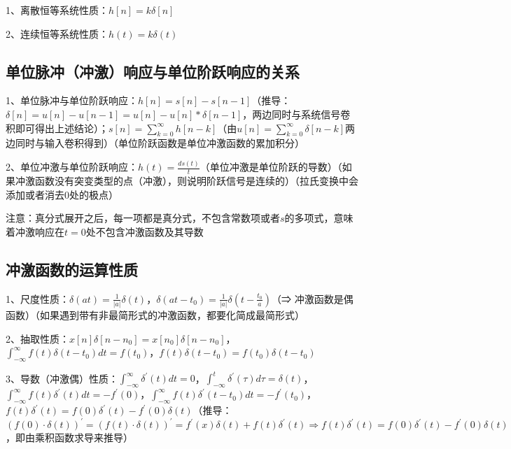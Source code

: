 1、离散恒等系统性质：$h[n]=k\delta[n]$

2、连续恒等系统性质：$h(t)=k\delta(t)$



\subsection{单位脉冲（冲激）响应与单位阶跃响应的关系}

1、单位脉冲与单位阶跃响应：$h[n]=s[n]-s[n-1]$（推导：$\delta[n]=u[n]-u[n-1]=u[n]-u[n]*\delta[n-1]$，两边同时与系统信号卷积即可得出上述结论）；$s[n]=\sum_{k=0}^{\infty}h[n-k]$（由$u[n]=\sum_{k=0}^{\infty}\delta[n-k]$两边同时与输入卷积得到）（单位阶跃函数是单位冲激函数的累加积分）

2、单位冲激与单位阶跃响应：$h(t) = \frac {ds(t)}{t}$（单位冲激是单位阶跃的导数）（如果冲激函数没有突变类型的点（冲激），则说明阶跃信号是连续的）（拉氏变换中会添加或者消去0处的极点）

注意：真分式展开之后，每一项都是真分式，不包含常数项或者$s$的多项式，意味着冲激响应在$t=0$处不包含冲激函数及其导数



\subsection{冲激函数的运算性质}

1、尺度性质：$\delta(at)=\frac{1}{|a|}\delta(t)$，$\delta(at-t_0)=\frac{1}{|a|}\delta(t-\frac{t_0}{a})$（⇒ 冲激函数是偶函数）（如果遇到带有非最简形式的冲激函数，都要化简成最简形式）

2、抽取性质：$x[n] \delta\left[n-n_{0}\right]=x\left[n_{0}\right] \delta\left[n-n_{0}\right]$，$\int_{-\infty}^{\infty} f(t) \delta\left(t-t_{0}\right) d t=f\left(t_{0}\right)$，$f(t) \delta\left(t-t_{0}\right)=f\left(t_{0}\right) \delta\left(t-t_{0}\right)$

3、导数（冲激偶）性质：$\int_{-\infty}^{\infty} \delta^{\prime}(t) d t=0$，$\int_{-\infty}^{t} \delta^{\prime}(\tau) d \tau=\delta(t)$，$\int_{-\infty}^{\infty} f(t) \delta^{\prime}(t) d t=-f^{\prime}(0)$，$\int_{-\infty}^{\infty} f(t) \delta^{\prime}\left(t-t_{0}\right) d t=-f^{\prime}\left(t_{0}\right)$，$f(t) \delta^{\prime}(t)=f(0) \delta^{\prime}(t)-f^{\prime}(0) \delta(t)$（推导：$(f(0)\cdot \delta(t))^\prime =(f(t)\cdot \delta(t))^\prime = f^\prime(x)\delta(t)+f(t)\delta^\prime(t) \Rightarrow f(t) \delta^{\prime}(t)=f(0) \delta^{\prime}(t)-f^{\prime}(0) \delta(t)$，即由乘积函数求导来推导）

